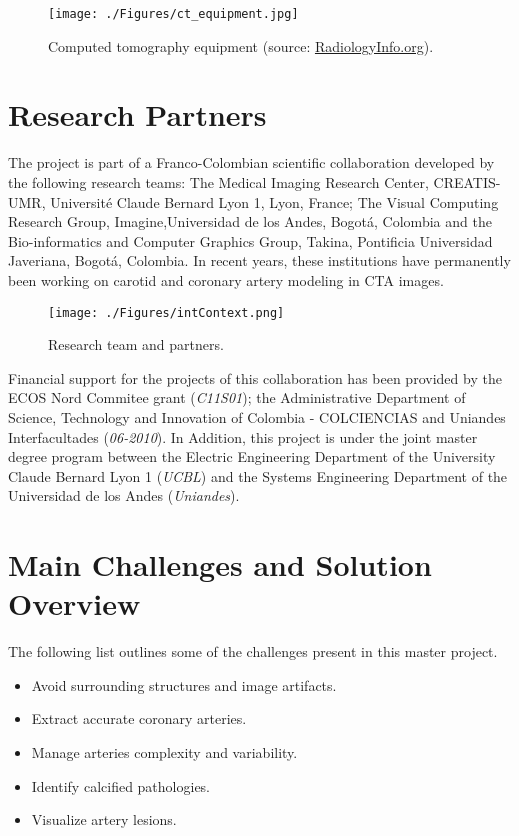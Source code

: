 \begin{figure}[htbp]
	\centering
		\texttt{[image: ./Figures/ct\_equipment.jpg]}
	\caption[Computed tomography equipment]{Computed tomography equipment (source: \href{http://www.radiologyinfo.org/}{RadiologyInfo.org}).}
	\label{fig:ct_eq}
\end{figure}

\section{Research Partners}
%
The project is part of a Franco-Colombian scientific collaboration developed by the following research teams: The Medical Imaging Research Center, CREATIS-UMR, Universit\'{e} Claude Bernard Lyon 1, Lyon, France; The Visual Computing Research Group, Imagine,Universidad de los Andes, Bogot\'{a}, Colombia and the Bio-informatics and Computer Graphics Group, Takina, Pontificia Universidad Javeriana, Bogot\'{a}, Colombia. In recent years, these institutions have permanently been working on carotid and coronary artery modeling in CTA images.

\begin{figure}[ht]
	\centering
		\texttt{[image: ./Figures/intContext.png]}
	\caption[Research Team]{Research team and partners.}
	\label{fig:int_cont}
\end{figure}

Financial support for the projects of this collaboration has been provided by the ECOS Nord Commitee grant (\textit{C11S01}); the Administrative Department of Science, Technology and Innovation of Colombia - COLCIENCIAS and Uniandes Interfacultades (\textit{06-2010}). In Addition, this project is under the joint master degree program between the Electric Engineering Department of the University Claude Bernard Lyon 1 (\textit{UCBL}) and the Systems Engineering Department of the Universidad de los Andes (\textit{Uniandes}).

\section{Main Challenges and Solution Overview}
The following list outlines some of the challenges present in this master project.

\begin{itemize}
\item Avoid surrounding structures and image artifacts.
\item Extract accurate coronary arteries.
\item Manage arteries complexity and variability.
\item Identify calcified pathologies.
\item Visualize artery lesions.
\end{itemize}

